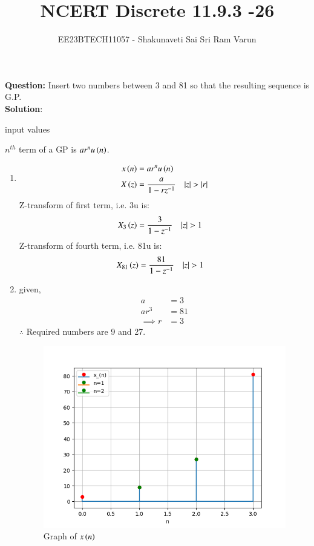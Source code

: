 \documentclass[journal,12pt,twocolumn]{IEEEtran}
\theoremstyle{remark}
\begin{document}

\vspace{3cm}

\title{NCERT Discrete 11.9.3 -26}
\author{EE23BTECH11057 - Shakunaveti Sai Sri Ram Varun$^{}$%
}
\maketitle
\newpage
\bigskip
\vspace{2cm}
\textbf{Question: }
Insert two numbers between 3 and 81 so that the resulting sequence is G.P.\\
\textbf{Solution}:\\
\begin{table}[htbp] 
\centering

\caption{input values}
\label{tab: Table 11.9.3.26.15}
\end{table}
$ n^{th}$ term of a GP is $ ar^{n}u\left(n\right)$.
\begin{enumerate}
\item 
\begin{align}
x\brak{n} &= ar^{n}u\brak{n} \label{eq:11.9.3.26.1}\\
X\brak{z} &= \frac{a}{1-rz^{-1}} \quad |z|>|r| \label{eq:11.9.3.26.2}
\end{align}
Z-transform of first term, i.e. 3u is:
\begin{align}
    X_3\brak{z} &= \frac{3}{1-z^{-1}} \quad |z|>1 \label{eq:11.9.3.26.3}
\end{align}
Z-transform of fourth term, i.e. 81u is:
\begin{align}
X_{81}\brak{z} &= \frac{81}{1-z^{-1}} \quad |z|>1 \label{eq:11.9.3.26.4}
\end{align}
\item 
given,
\begin{align}
a &= 3\\
ar^3 &=81\\
\implies r&=3
\end{align}
$ \therefore $ Required numbers are 9 and 27.
\begin{figure}[h!]
    \includegraphics[width = \columnwidth]{figs/Figure_1.png}
    \caption{Graph of $ x\left(n\right)$ }
    \label{fig: 11.9.3.26.17}
\end{figure}
\end{enumerate}
\end{document}
